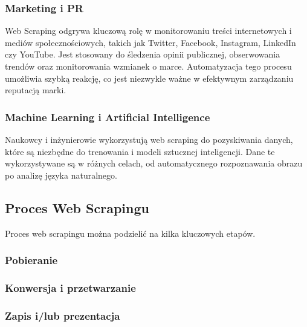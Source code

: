 \subsubsection{Marketing i PR}

Web Scraping odgrywa kluczową rolę w monitorowaniu treści internetowych i mediów społecznościowych, takich jak Twitter, Facebook, Instagram, LinkedIn czy YouTube.
Jest stosowany do śledzenia opinii publicznej, obserwowania trendów oraz monitorowania wzmianek o marce.
Automatyzacja tego procesu umożliwia szybką reakcję, co jest niezwykle ważne w efektywnym zarządzaniu reputacją marki\cite{monitoring-social-media}.

\subsubsection{Machine Learning i Artificial Intelligence}

Naukowcy i inżynierowie wykorzystują web scraping do pozyskiwania danych, które są niezbędne do trenowania i modeli sztucznej inteligencji\cite{openai-data-collection}.
Dane te wykorzystywane są w różnych celach, od automatycznego rozpoznawania obrazu po analizę języka naturalnego.


\subsection{Proces Web Scrapingu}\label{subsec:web-scraping-process}

Proces web scrapingu można podzielić na kilka kluczowych etapów.

\subsubsection{Pobieranie}

\subsubsection{Konwersja i przetwarzanie}

\subsubsection{Zapis i/lub prezentacja}